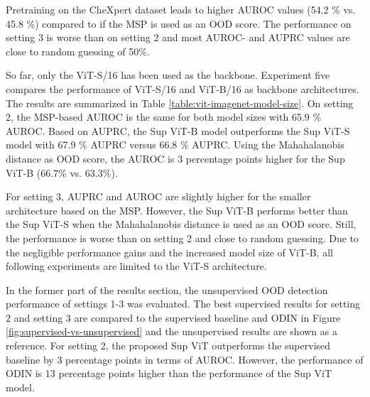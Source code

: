 Pretraining on the CheXpert dataset leads to higher AUROC values (54.2 \% vs. 45.8 \%) compared to \citep{Berger2021} if the MSP is used as an OOD score. 
The performance on setting 3 is worse than on setting 2 and most AUROC- and AUPRC values are close to random guessing of 50\%.
\par
So far, only the ViT-S/16 has been used as the backbone.
Experiment five compares the performance of ViT-S/16 and ViT-B/16 as backbone architectures.
The results are summarized in Table \ref{table:vit-imagenet-model-size}.
On setting 2, the MSP-based AUROC is the same for both model sizes with 65.9 \% AUROC.
Based on AUPRC, the Sup ViT-B model outperforms the Sup ViT-S model with 67.9 \% AUPRC versus 66.8 \% AUPRC.
Using the Mahahalanobis distance as OOD score, the AUROC is 3 percentage points higher for the Sup ViT-B (66.7\% vs. 63.3\%).
\par
For setting 3, AUPRC and AUROC are slightly higher for the smaller architecture based on the MSP.
However, the Sup ViT-B performs better than the Sup ViT-S when the Mahahalanobis distance is used as an OOD score.
Still, the performance is worse than on setting 2 and close to random guessing.
Due to the negligible performance gains and the increased model size of ViT-B, all following experiments are limited to the ViT-S architecture.
\par
{}
In the former part of the results section, the unsupervised OOD detection performance of settings 1-3 was evaluated.
The best supervised results for setting 2 and setting 3 are compared to the supervised baseline and ODIN in Figure \ref{fig:supervised-vs-unsupervised} and the unsupervised results are shown as a reference.
For setting 2, the proposed Sup ViT outperforms the supervised baseline by 3 percentage points in terms of AUROC.
However, the performance of ODIN is 13 percentage points higher than the performance of the Sup ViT model.
